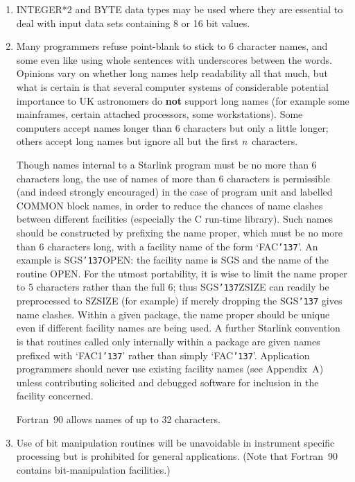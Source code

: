 \documentclass[twoside,11pt,nolof,noabs]{starlink}
\renewcommand{\_}{{\tt\char'137}}
\begin{document}
\begin{enumerate}

\item INTEGER*2 and BYTE data types may be used where they are essential to
deal with input data sets containing 8 or 16 bit values.

\item Many programmers refuse point-blank to stick to 6 character
names, and some even like using
whole sentences with underscores between the words.  Opinions vary
on whether long names help readability all that much, but what is
certain is that several computer systems of considerable potential
importance to UK astronomers do \textbf{not} support long
names (for example some mainframes,
certain attached processors, some workstations).  Some
computers accept names longer than 6 characters
but only a little longer; others
accept long names but ignore all but the first \textit{n}\, characters.

Though names internal to a Starlink program must be no more than 6 characters
long, the use of names of more than 6 characters is permissible (and indeed
strongly encouraged) in the case of program unit and
labelled COMMON block names, in
order to reduce the chances of name clashes between different facilities
(especially the C run-time library).
Such names should be constructed by prefixing the name proper, which must be
no more than 6 characters long, with a facility name of the form `FAC\_'.
An example is SGS\_OPEN: the facility name is SGS and the name of the routine
OPEN.
For the utmost portability,
it is wise to limit the name proper to 5 characters
rather than the full 6; thus SGS\_ZSIZE can readily be preprocessed to SZSIZE
(for example) if merely dropping the SGS\_ gives name clashes.  Within a
given package, the name proper should be unique even if different
facility names are being used.
A further Starlink convention is that routines called only internally within a
package are given names prefixed with `FAC1\_' rather than simply `FAC\_'.
Application programmers should never use existing
facility names (see Appendix~A) unless contributing solicited
and debugged software for inclusion in the facility concerned.

Fortran~90 allows names of up to 32 characters.

\item Use of bit manipulation routines will be unavoidable in instrument
specific processing but is prohibited for general applications.  (Note
that Fortran~90 contains bit-manipulation facilities.)


\end{enumerate}
\end{document}
